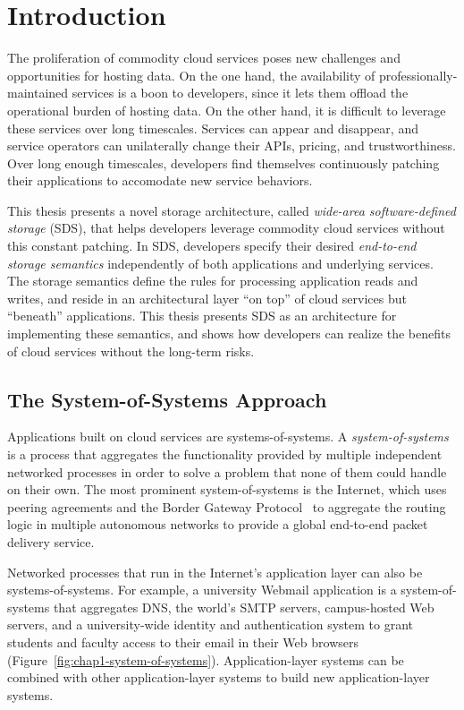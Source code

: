 \chapter{Introduction}
\label{chap:introduction}

The proliferation of commodity cloud services poses new challenges and
opportunities for hosting data.  On the one hand, the availability of
professionally-maintained services is a boon to developers, since it lets them
offload the operational burden of hosting data.  On the other
hand, it is difficult to leverage these services over long
timescales.  Services can appear and disappear, and service operators can
unilaterally change their APIs, pricing, and trustworthiness.
Over long enough timescales, developers find themselves continuously
patching their applications to accomodate new service behaviors.

This thesis presents a novel storage architecture, called \emph{wide-area
software-defined storage} (SDS), that helps developers
leverage commodity cloud services without this constant patching.
In SDS, developers specify their desired
\emph{end-to-end storage semantics} independently of
both applications and underlying services.  The storage semantics define the
rules for processing application reads and writes, and reside in an architectural
layer ``on top'' of cloud services but ``beneath'' applications.
This thesis presents SDS as an architecture for implementing these semantics, and
shows how developers can realize the benefits of cloud services without the
long-term risks.

\section{The System-of-Systems Approach}

Applications built on cloud services are systems-of-systems.
A \emph{system-of-systems} is a process that aggregates the
functionality provided by multiple independent networked processes
in order to solve a problem that none of them could
handle on their own.  The most prominent system-of-systems 
is the Internet, which uses peering agreements and the Border Gateway
Protocol~\cite{bgp} to aggregate the routing logic in
multiple autonomous networks to provide a global end-to-end packet delivery
service.

Networked processes that run in the Internet's application layer can also
be systems-of-systems.  For example, a university Webmail
application is a system-of-systems that 
aggregates DNS, the world's SMTP servers, campus-hosted
Web servers, and a university-wide identity and authentication
system to grant students and faculty access to their email in their Web browsers
(Figure~\ref{fig:chap1-system-of-systems}).  Application-layer systems can be combined with other
application-layer systems to build new application-layer systems.


